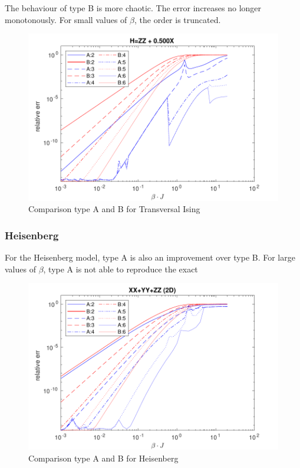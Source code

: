 The behaviour of type B is more chaotic. The error increases no longer monotonously. For small values of $\beta$, the order is truncated.


\begin{figure}[H]
    \center
    \includegraphics[width=\textwidth]{Figuren/benchmarking/t_ising_copmAB6.pdf}
    \caption{Comparison type A and B for Transversal Ising}
    \label{fig:benchmark:tising}
\end{figure}

\subsubsection{Heisenberg}

For the Heisenberg model, type A is also an improvement over type B. For large values of $\beta$, type A is not able to reproduce the exact


\begin{figure}[H]
    \center
    \includegraphics[width=\textwidth]{Figuren/benchmarking/heisenberg_compAB6.pdf}
    \caption{Comparison type A and B for Heisenberg}
    \label{fig:benchmark:Heisenberg}
\end{figure}


